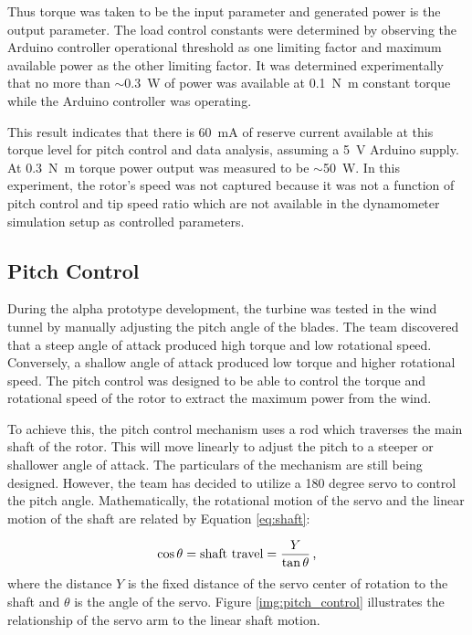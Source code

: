 \documentclass[11pt,letterpaper,conference]{IEEEtran}
\begin{document}
Thus torque was taken to be the input parameter and generated power is the
output parameter. The load control constants were determined by observing the
Arduino controller operational threshold as one limiting factor and maximum
available power as the other limiting factor. It was determined experimentally
that no more than $\sim$\qty{0.3}{\W} of power was available at
\qty{.1}{\newton\m} constant torque while the Arduino controller was operating.

This result indicates that there is \qty{60}{\mA} of reserve current available
at this torque level for pitch control and data analysis, assuming a
\qty{5}{\V} Arduino supply. At \qty{.3}{\newton\m} torque power output was
measured to be $\sim$\qty{50}{\W}. In this experiment, the rotor's speed was
not captured because it was not a function of pitch control and tip speed ratio
which are not available in the dynamometer simulation setup as controlled
parameters.

\subsection{Pitch Control}

During the alpha prototype development, the turbine was tested in the wind
tunnel by manually adjusting the pitch angle of the blades. The team discovered
that a steep angle of attack produced high torque and low rotational speed.
Conversely, a shallow angle of attack produced low torque and higher rotational
speed. The pitch control was designed to be able to control the torque and
rotational speed of the rotor to extract the maximum power from the wind.

To achieve this, the pitch control mechanism uses a rod which traverses the
main shaft of the rotor. This will move linearly to adjust the pitch to a
steeper or shallower angle of attack. The particulars of the mechanism are
still being designed. However, the team has decided to utilize a 180 degree
servo to control the pitch angle. Mathematically, the rotational motion of the
servo and the linear motion of the shaft are related by Equation
\eqref{eq:shaft}:

\begin{equation}
    \label{eq:shaft}
    \cos\theta = \text{shaft travel} = \frac{Y}{\tan\theta}
    \text{\,,}
\end{equation}
where the distance $Y$ is the fixed distance of the servo center of rotation to
the shaft and $\theta$ is the angle of the servo.
Figure \ref{img:pitch_control} illustrates the relationship of the servo arm
to the linear shaft motion.
\end{document}
